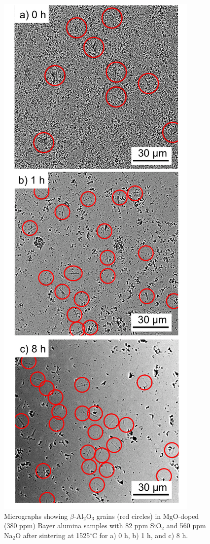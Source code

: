 \newpage
\begin{figure}[H]
	\centering
	\includegraphics{Chapter-5/Figures/Figure8.png}
	\caption{Micrographs showing $\beta$-Al$_{2}$O$_{3}$ grains (red circles) in MgO-doped (380 ppm) Bayer alumina samples with 82 ppm SiO$_{2}$ and 560 ppm Na$_{2}$O after sintering at 1525$^{\circ}$C for a) 0 h, b) 1 h, and c) 8 h.}
	\label{Ch5-figure:Figure8}
\end{figure}

